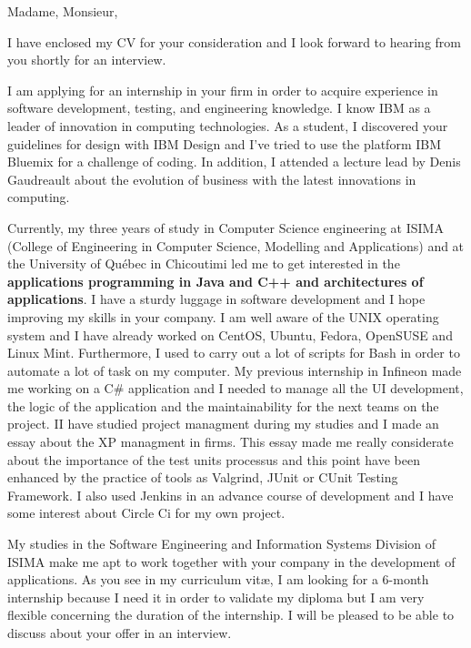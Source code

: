 \date{\today}
\opening{Madame, Monsieur,}
\closing{I have enclosed my CV for your consideration and I look forward to hearing from you shortly for an interview.}

\makelettertitle

I am applying for an internship in your firm in order to acquire experience in software development, testing, and engineering knowledge. I know IBM as a leader of innovation in computing technologies. As a student, I discovered your guidelines for design with IBM Design and I've tried to use the platform IBM Bluemix for a challenge of coding. In addition, I attended a lecture lead by Denis Gaudreault about the evolution of business with the latest innovations in computing.

Currently, my three years of study in Computer Science engineering at ISIMA (College of Engineering in Computer Science, Modelling and Applications) and at the University of Québec in Chicoutimi led me to get interested in the \textbf{applications programming in Java and C++ and architectures of applications}. I have a sturdy luggage in software development and I hope improving my skills in your company. I am well aware of the UNIX operating system and I have already worked on CentOS, Ubuntu, Fedora, OpenSUSE and Linux Mint. Furthermore, I used to carry out a lot of scripts for Bash in order to automate a lot of task on my computer. My previous internship in Infineon made me working on a C\# application and I needed to manage all the UI development, the logic of the application and the maintainability for the next teams on the project. II have studied project managment during my studies and I made an essay about the XP managment in firms. This essay made me really considerate about the importance of the test units processus and this point have been enhanced by the practice of tools as Valgrind, JUnit or CUnit Testing Framework. I also used Jenkins in an advance course of development and I have some interest about Circle Ci for my own project.

My studies in the Software Engineering and Information Systems Division of ISIMA make me apt to work together with your company in the development of applications. As you see in my curriculum vit\ae{}, I am looking for a 6-month internship because I need it in order to validate my diploma but I am very flexible concerning the duration of the internship. I will be pleased to be able to discuss about your offer in an interview.

\makeletterclosing

